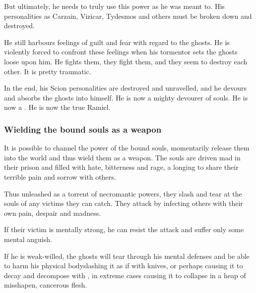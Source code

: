 But ultimately, he needs to truly use this power as he was meant to. 
His personalities as Carzain, Vizicar, Tydesmos and others must be broken down and destroyed. 

He still harbours feelings of guilt and fear with regard to the ghosts. 
He is violently forced to confront these feelings when his tormentor sets the ghosts loose upon him. 
He fights them, they fight them, and they seem to destroy each other. 
It is pretty traumatic. 

In the end, his Scion personalities are destroyed and unravelled, and he devours and absorbs the ghosts into himself. 
He is now a mighty devourer of souls. 
He is now a \Malach. 
He is now the true Ramiel. 






\subsubsection{Wielding the bound souls as a weapon}
It is possible to channel the power of the bound souls, momentarily release them into the world and thus wield them as a weapon. The souls are driven mad in their prison and filled with hate, bitterness and rage, a longing to share their terrible pain and sorrow with others. 

Thus unleashed as a torrent of necromantic powers, they slash and tear at the souls of any victims they can catch. They attack by infecting others with their own pain, despair and madness.

If their victim is mentally strong, he can resist the attack and suffer only some mental anguish. 

If he is weak-willed, the ghosts will tear through his mental defenses and be able to harm his physical body\dash slashing it as if with knives, or perhaps causing it to decay and decompose with , in extreme cases causing it to collapse in a heap of misshapen, cancerous flesh. 

